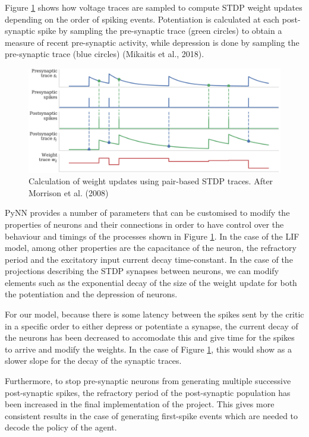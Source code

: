 \documentclass[10pt]{article}
\begin{document}
    Figure \ref{fig:spikeTraces} shows how voltage traces are sampled to compute STDP weight updates depending on the order of spiking events. Potentiation is calculated at each post-synaptic spike by sampling the pre-synaptic trace (green circles) to obtain a measure of recent pre-synaptic activity, while depression is done by sampling the pre-synaptic trace (blue circles) (Mikaitis et al., 2018).

    \begin{figure}
    \center
    \includegraphics[width=147mm]{./spikeTraces.png}
    \caption{Calculation of weight updates using pair-based STDP traces. After Morrison et al. (2008)}
    \label{fig:spikeTraces}
    \end{figure}

    PyNN provides a number of parameters that can be customised to modify the properties of neurons and their connections in order to have control over the behaviour and timings of the processes shown in Figure \ref{fig:spikeTraces}. In the case of the LIF model, among other properties are the capacitance of the neuron, the refractory period and the excitatory input current decay time-constant. In the case of the projections describing the STDP synapses between neurons, we can modify elements such as the exponential decay of the size of the weight update for both the potentiation and the depression of neurons.

    For our model, because there is some latency between the spikes sent by the critic in a specific order to either depress or potentiate a synapse, the current decay of the neurons has been decreased to accomodate this and give time for the spikes to arrive and modify the weights. In the case of Figure \ref{fig:spikeTraces}, this would show as a slower slope for the decay of the synaptic traces.
    
    Furthermore, to stop pre-synaptic neurons from generating multiple successive post-synaptic spikes, the refractory period of the post-synaptic population has been increased in the final implementation of the project. This gives more consistent results in the case of generating first-spike events which are needed to decode the policy of the agent.
\end{document}
